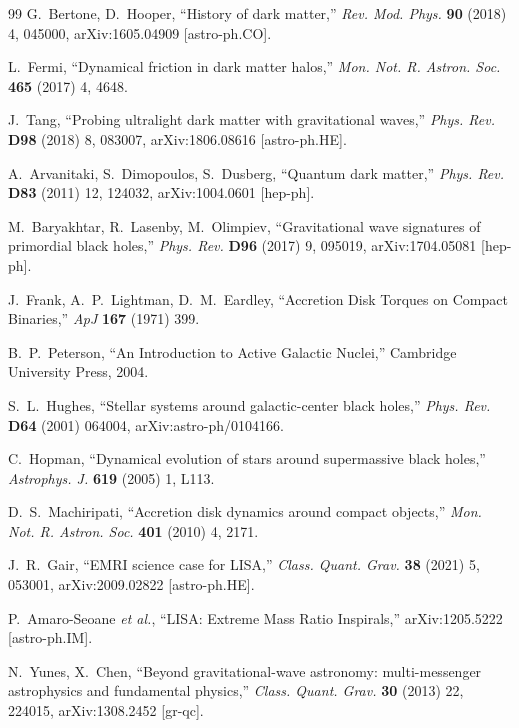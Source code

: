 \documentclass[11pt]{article}
\begin{document}
\begin{thebibliography}{99}
 G.~Bertone, D.~Hooper, ``History of dark matter,'' \textit{Rev. Mod. Phys.} \textbf{90} (2018) 4, 045000, arXiv:1605.04909 [astro-ph.CO].

 L.~Fermi, ``Dynamical friction in dark matter halos,'' \textit{Mon. Not. R. Astron. Soc.} \textbf{465} (2017) 4, 4648.

 J.~Tang, ``Probing ultralight dark matter with gravitational waves,'' \textit{Phys. Rev.} \textbf{D98} (2018) 8, 083007, arXiv:1806.08616 [astro-ph.HE].

 A.~Arvanitaki, S.~Dimopoulos, S.~Dusberg, ``Quantum dark matter,'' \textit{Phys. Rev.} \textbf{D83} (2011) 12, 124032, arXiv:1004.0601 [hep-ph].

 M.~Baryakhtar, R.~Lasenby, M.~Olimpiev, ``Gravitational wave signatures of primordial black holes,'' \textit{Phys. Rev.} \textbf{D96} (2017) 9, 095019, arXiv:1704.05081 [hep-ph].

 J.~Frank, A.~P.~Lightman, D.~M.~Eardley, ``Accretion Disk Torques on Compact Binaries,'' \textit{ApJ} \textbf{167} (1971) 399.

 B.~P.~Peterson, ``An Introduction to Active Galactic Nuclei,'' Cambridge University Press, 2004.

 S.~L.~Hughes, ``Stellar systems around galactic-center black holes,'' \textit{Phys. Rev.} \textbf{D64} (2001) 064004, arXiv:astro-ph/0104166.

 C.~Hopman, ``Dynamical evolution of stars around supermassive black holes,'' \textit{Astrophys. J.} \textbf{619} (2005) 1, L113.

 D.~S.~Machiripati, ``Accretion disk dynamics around compact objects,'' \textit{Mon. Not. R. Astron. Soc.} \textbf{401} (2010) 4, 2171.

 J.~R.~Gair, ``EMRI science case for LISA,'' \textit{Class. Quant. Grav.} \textbf{38} (2021) 5, 053001, arXiv:2009.02822 [astro-ph.HE].

 P.~Amaro-Seoane \textit{et al.}, ``LISA: Extreme Mass Ratio Inspirals,'' arXiv:1205.5222 [astro-ph.IM].

 N.~Yunes, X.~Chen, ``Beyond gravitational-wave astronomy: multi-messenger astrophysics and fundamental physics,'' \textit{Class. Quant. Grav.} \textbf{30} (2013) 22, 224015, arXiv:1308.2452 [gr-qc].


\end{thebibliography}
\end{document}
